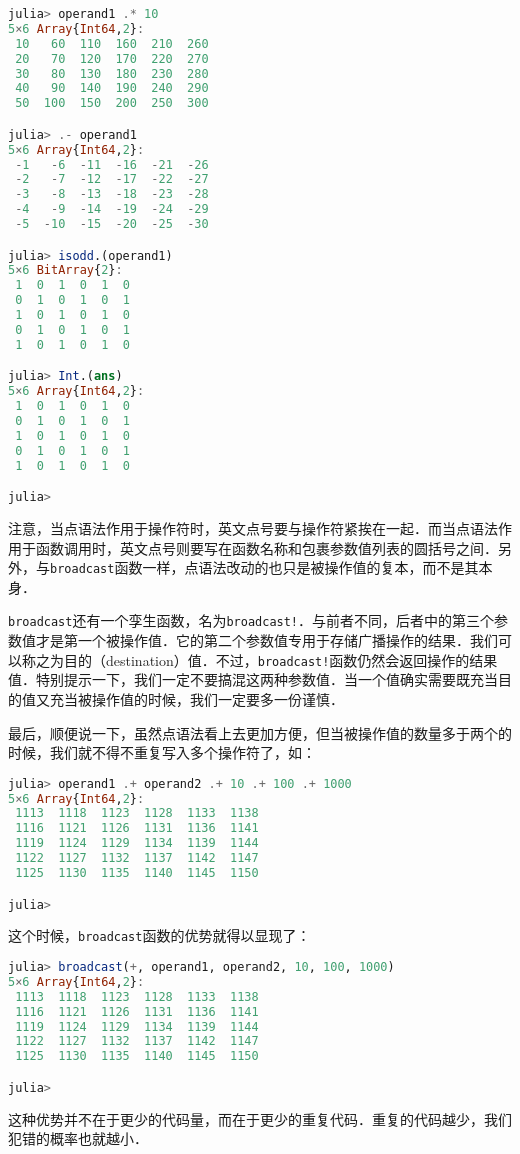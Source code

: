 \begin{lstlisting}[language=julia]
julia> operand1 .* 10
5×6 Array{Int64,2}:
 10   60  110  160  210  260
 20   70  120  170  220  270
 30   80  130  180  230  280
 40   90  140  190  240  290
 50  100  150  200  250  300

julia> .- operand1
5×6 Array{Int64,2}:
 -1   -6  -11  -16  -21  -26
 -2   -7  -12  -17  -22  -27
 -3   -8  -13  -18  -23  -28
 -4   -9  -14  -19  -24  -29
 -5  -10  -15  -20  -25  -30

julia> isodd.(operand1)
5×6 BitArray{2}:
 1  0  1  0  1  0
 0  1  0  1  0  1
 1  0  1  0  1  0
 0  1  0  1  0  1
 1  0  1  0  1  0

julia> Int.(ans)
5×6 Array{Int64,2}:
 1  0  1  0  1  0
 0  1  0  1  0  1
 1  0  1  0  1  0
 0  1  0  1  0  1
 1  0  1  0  1  0

julia> 
\end{lstlisting}

注意，当点语法作用于操作符时，英文点号要与操作符紧挨在一起．而当点语法作用于函数调用时，英文点号则要写在函数名称和包裹参数值列表的圆括号之间．另外，与\verb|broadcast|函数一样，点语法改动的也只是被操作值的复本，而不是其本身．

\verb|broadcast|还有一个孪生函数，名为\verb|broadcast!|．与前者不同，后者中的第三个参数值才是第一个被操作值．它的第二个参数值专用于存储广播操作的结果．我们可以称之为目的（destination）值．不过，\verb|broadcast!|函数仍然会返回操作的结果值．特别提示一下，我们一定不要搞混这两种参数值．当一个值确实需要既充当目的值又充当被操作值的时候，我们一定要多一份谨慎．

最后，顺便说一下，虽然点语法看上去更加方便，但当被操作值的数量多于两个的时候，我们就不得不重复写入多个操作符了，如：

\begin{lstlisting}[language=julia]
julia> operand1 .+ operand2 .+ 10 .+ 100 .+ 1000
5×6 Array{Int64,2}:
 1113  1118  1123  1128  1133  1138
 1116  1121  1126  1131  1136  1141
 1119  1124  1129  1134  1139  1144
 1122  1127  1132  1137  1142  1147
 1125  1130  1135  1140  1145  1150

julia> 
\end{lstlisting}

这个时候，\verb|broadcast|函数的优势就得以显现了：

\begin{lstlisting}[language=julia]
julia> broadcast(+, operand1, operand2, 10, 100, 1000)
5×6 Array{Int64,2}:
 1113  1118  1123  1128  1133  1138
 1116  1121  1126  1131  1136  1141
 1119  1124  1129  1134  1139  1144
 1122  1127  1132  1137  1142  1147
 1125  1130  1135  1140  1145  1150

julia> 
\end{lstlisting}

这种优势并不在于更少的代码量，而在于更少的重复代码．重复的代码越少，我们犯错的概率也就越小．